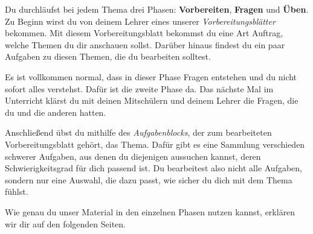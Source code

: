 \documentclass[../main.tex]{subfiles}
\begin{document}
Du durchläufst bei jedem Thema drei Phasen: \textbf{Vorbereiten}, \textbf{Fragen} und \textbf{Üben}. Zu Beginn wirst du von deinem Lehrer eines unserer \emph{Vorbereitungsblätter} bekommen. Mit diesem Vorbereitungsblatt bekommst du eine Art Auftrag, welche Themen du dir anschauen sollst. Darüber hinaus findest du ein paar Aufgaben zu diesen Themen, die du bearbeiten solltest. 

Es ist vollkommen normal, dass in dieser Phase Fragen entstehen und du nicht sofort alles verstehst. Dafür ist die zweite Phase da. Das nächste Mal im Unterricht klärst du mit deinen Mitschülern und deinem Lehrer die Fragen, die du und die anderen hatten.

Anschließend übst du mithilfe des \emph{Aufgabenblocks}, der zum bearbeiteten Vorbereitungsblatt gehört, das Thema. Dafür gibt es eine Sammlung verschieden schwerer Aufgaben, aus denen du diejenigen aussuchen kannst, deren Schwierigkeitsgrad für dich passend ist. Du bearbeitest also nicht alle Aufgaben, sondern nur eine Auswahl, die dazu passt, wie sicher du dich mit dem Thema fühlst.

Wie genau du unser Material in den einzelnen Phasen nutzen kannst, erklären wir dir auf den folgenden Seiten.
\end{document}
